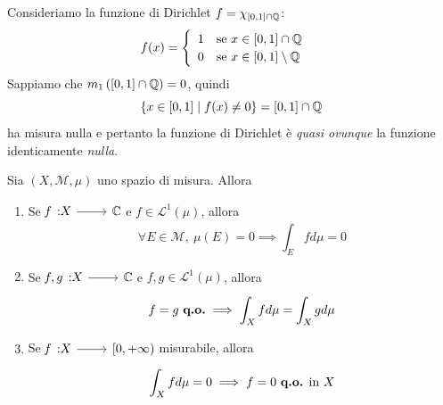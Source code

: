 \begin{example}
	Consideriamo la funzione di Dirichlet $f=\chi_{\left[0,1\right]\cap\mathbb{Q}}$:
	\begin{equation*}
		f(x)=\begin{cases}
			\begin{array}{ll}
				1&\text{se }x\in\left[0,1\right]\cap\mathbb{Q}\\
				0&\text{se }x\in\left[0,1\right]\setminus\mathbb{Q}
			\end{array}
		\end{cases}
	\end{equation*}
Sappiamo che $m_1\left(\left[0,1\right]\cap\mathbb{Q}\right)=0$, quindi
\begin{equation*}
	\left\{x\in\left[0,1\right]\mid f(x)\neq 0\right\}=\left[0,1\right]\cap \mathbb{Q}
\end{equation*}
ha misura nulla e pertanto la funzione di Dirichlet è \textit{quasi ovunque} la funzione identicamente \textit{nulla}.
\end{example}
\begin{property}\label{ruoloinsiemimisuranulla}
Sia $\left(X,\mathcal{M},\mu\right)$ uno spazio di misura. Allora
\begin{enumerate}
	\item Se $\funz{f}{X}{\complexset}$ e $f\in\mathcal{L}^{1}\left(\mu\right)$, allora
	\begin{equation}
		\forall E\in\mathcal{M},\ \mu\left(E\right)=0\implies \int_Efd\mu=0
	\end{equation}
\item Se $\funz{f,g}{X}{\complexset}$ e $f,g\in\mathcal{L}^{1}\left(\mu\right)$, allora
\begin{equation}
	f=g\ \text{\textbf{q.o.}}\implies \int_Xfd\mu=\int_Xgd\mu
\end{equation}
\item Se $\funz{f}{X}{\left[0,+\infty\right)}$ misurabile, allora
\begin{equation}
	\int_X fd\mu=0\implies f=0\ \text{\textbf{q.o.} in }X
\end{equation}
\end{enumerate}
\end{property}
